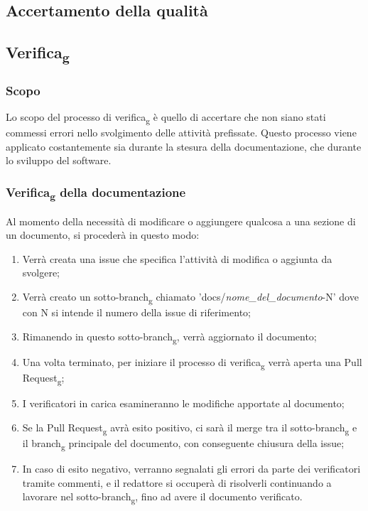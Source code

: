     \subsection{Accertamento della qualità}
    \subsection{Verifica\textsubscript{g}}
        \subsubsection{Scopo}
        Lo scopo del processo di verifica\textsubscript{g} è quello di accertare che non siano stati commessi errori nello svolgimento
        delle attività prefissate. Questo processo viene applicato costantemente sia durante la stesura
        della documentazione, che durante lo sviluppo del software.
        \subsubsection{Verifica\textsubscript{g} della documentazione}
        Al momento della necessità di modificare o aggiungere qualcosa a una sezione di un documento, si procederà in questo modo:
        \begin{enumerate}
            \item Verrà creata una issue che specifica l'attività di modifica o aggiunta da svolgere;
            \item Verrà creato un sotto-branch\textsubscript{g} chiamato 'docs/\textit{nome\_del\_documento}-N' dove con N si intende il numero della issue di riferimento;
            \item Rimanendo in questo sotto-branch\textsubscript{g}, verrà aggiornato il documento;
            \item Una volta terminato, per iniziare il processo di verifica\textsubscript{g} verrà aperta una Pull Request\textsubscript{g};
            \item I verificatori in carica esamineranno le modifiche apportate al documento;
            \item Se la Pull Request\textsubscript{g} avrà esito positivo, ci sarà il merge tra il sotto-branch\textsubscript{g} e il branch\textsubscript{g} principale del documento, con conseguente chiusura della issue;
            \item In caso di esito negativo, verranno segnalati gli errori da parte dei verificatori tramite commenti, e il redattore si occuperà di risolverli continuando a lavorare nel sotto-branch\textsubscript{g}, fino ad avere il documento verificato.
        \end{enumerate}

